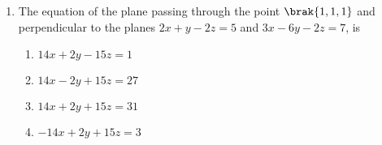 \begin{enumerate}
         \item %
		 The equation of the plane passing through the point $\brak{1,1,1}$ and perpendicular to the planes $2x+y-2z=5$ and $3x-6y-2z=7$, is \hfill{}\\
\begin{enumerate}
        \item $14x+2y-15z=1$                             
        \item $14x-2y+15z=27$                           
        \item $14x+2y+15z=31$            
        \item $-14x+2y+15z=3$\\          
\end{enumerate}

\end{enumerate}
